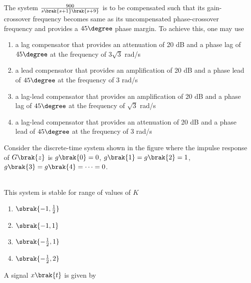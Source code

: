 \iffalse
\chapter{2007}
\author{AI24BTECH11009}
\section{ee}
\fi

\item The system $\frac{900}{s\brak{s+1}\brak{s+9}}$ is to be compensated such that its gain-crossover frequency becomes same as its uncompensated phase-crossover frequency and provides a $45\degree$ phase margin. To achieve this, one may use
    \begin{enumerate}
        \item a lag compensator that provides an attenuation of 20 dB and a phase lag of $45\degree$ at the frequency of $3\sqrt{3}$ rad/s
        \item a lead compensator that provides an amplification of 20 dB and a phase lead of $45\degree$ at the frequency of 3 rad/s
        \item a lag-lead compensator that provides an amplification of 20 dB and a phase lag of $45\degree$ at the frequency of $\sqrt{3}$ rad/s
        \item a lag-lead compensator that provides an attenuation of 20 dB and a phase lead of $45\degree$ at the frequency of 3 rad/s \\
    \end{enumerate}
\item Consider the discrete-time system shown in the figure where the impulse response of $G\brak{z}$ is $g\brak{0}=0$, $g\brak{1}=g\brak{2}=1$, $g\brak{3}=g\brak{4}=\cdots=0$.
\begin{figure}[!ht]
    \centering
    \resizebox{0.5\textwidth}{!}{%
    
    }%
  \end{figure}\\
     This system is stable for range of values of $K$
\begin{enumerate}
    \item $\sbrak{-1, \frac{1}{2}}$
    \item $\sbrak{-1, 1}$
    \item $\sbrak{-\frac{1}{2}, 1}$
    \item $\sbrak{-\frac{1}{2}, 2}$ \\
\end{enumerate}
\item A signal $x\brak{t}$ is given by 
